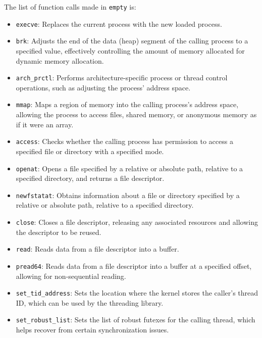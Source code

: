 \documentclass[final,5p,times,authoryear]{elsarticle}
\begin{document}
The list of function calls made in {\tt empty} is: 

\begin{itemize}
  \item \texttt{execve}: Replaces the current process with the new loaded process.
  
  \item \texttt{brk}: Adjusts the end of the data (heap) segment of the calling process to a specified value, effectively controlling the amount of memory allocated for dynamic memory allocation.
  
  \item \texttt{arch\_prctl}: Performs architecture-specific process or thread control operations, such as adjusting the process' address space.
  
  \item \texttt{mmap}: Maps a region of memory into the calling process's address space, allowing the process to access files, shared memory, or anonymous memory as if it were an array.
  
  \item \texttt{access}: Checks whether the calling process has permission to access a specified file or directory with a specified mode.
  
  \item \texttt{openat}: Opens a file specified by a relative or absolute path, relative to a specified directory, and returns a file descriptor.
  
  \item \texttt{newfstatat}: Obtains information about a file or directory specified by a relative or absolute path, relative to a specified directory.
  
  \item \texttt{close}: Closes a file descriptor, releasing any associated resources and allowing the descriptor to be reused.
  
  \item \texttt{read}: Reads data from a file descriptor into a buffer.
  
  \item \texttt{pread64}: Reads data from a file descriptor into a buffer at a specified offset, allowing for non-sequential reading.
  
  \item \texttt{set\_tid\_address}: Sets the location where the kernel stores the caller's thread ID, which can be used by the threading library.
  
  \item \texttt{set\_robust\_list}: Sets the list of robust futexes for the calling thread, which helps recover from certain synchronization issues.
  

\end{itemize}
\end{document}
